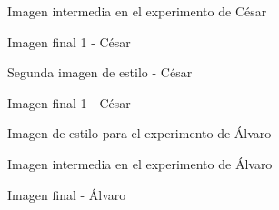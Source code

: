 \documentclass[es]{uc3mreport}
\begin{document}
\begin{report}
    \begin{figure}
        \caption{Imagen intermedia en el experimento de César}
        \label{intermedio-clm}
    \end{figure}

    \begin{figure}
        \caption{Imagen final 1 - César}
        \label{final-clm-1}
    \end{figure}

    \begin{figure}
        \caption{Segunda imagen de estilo - César}
        \label{city-2}
    \end{figure}

    \begin{figure}
        \caption{Imagen final 1 - César}
        \label{final-clm-2}
    \end{figure}

    \begin{figure}
        \caption{Imagen de estilo para el experimento de Álvaro}
        \label{tm}
    \end{figure}

    \begin{figure}
        \caption{Imagen intermedia en el experimento de Álvaro}
        \label{intermedio-age}
    \end{figure}

    \begin{figure}
        \caption{Imagen final - Álvaro}
        \label{final-age}
    \end{figure}


\end{report}
\end{document}
